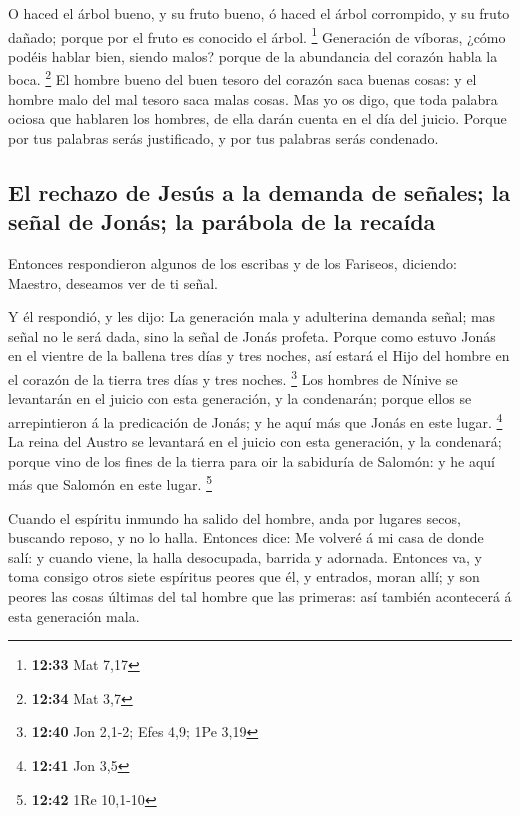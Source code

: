  O haced el árbol bueno, y su fruto bueno, ó haced el
árbol corrompido, y su fruto dañado; porque por el fruto es conocido el
árbol. \footnote{\textbf{12:33} Mat 7,17}  Generación de
víboras, ¿cómo podéis hablar bien, siendo malos? porque de la abundancia
del corazón habla la boca. \footnote{\textbf{12:34} Mat 3,7}
 El hombre bueno del buen tesoro del corazón saca buenas
cosas: y el hombre malo del mal tesoro saca malas cosas. 
Mas yo os digo, que toda palabra ociosa que hablaren los hombres, de
ella darán cuenta en el día del juicio.  Porque por tus
palabras serás justificado, y por tus palabras serás condenado.

\hypertarget{el-rechazo-de-jesuxfas-a-la-demanda-de-seuxf1ales-la-seuxf1al-de-jonuxe1s-la-paruxe1bola-de-la-recauxedda}{%
\subsection{El rechazo de Jesús a la demanda de señales; la señal de
Jonás; la parábola de la
recaída}\label{el-rechazo-de-jesuxfas-a-la-demanda-de-seuxf1ales-la-seuxf1al-de-jonuxe1s-la-paruxe1bola-de-la-recauxedda}}

 Entonces respondieron algunos de los escribas y de los
Fariseos, diciendo: Maestro, deseamos ver de ti señal.

 Y él respondió, y les dijo: La generación mala y
adulterina demanda señal; mas señal no le será dada, sino la señal de
Jonás profeta.  Porque como estuvo Jonás en el vientre de
la ballena tres días y tres noches, así estará el Hijo del hombre en el
corazón de la tierra tres días y tres noches. \footnote{\textbf{12:40}
  Jon 2,1-2; Efes 4,9; 1Pe 3,19}  Los hombres de Nínive
se levantarán en el juicio con esta generación, y la condenarán; porque
ellos se arrepintieron á la predicación de Jonás; y he aquí más que
Jonás en este lugar. \footnote{\textbf{12:41} Jon 3,5} 
La reina del Austro se levantará en el juicio con esta generación, y la
condenará; porque vino de los fines de la tierra para oir la sabiduría
de Salomón: y he aquí más que Salomón en este lugar. \footnote{\textbf{12:42}
  1Re 10,1-10}

 Cuando el espíritu inmundo ha salido del hombre, anda
por lugares secos, buscando reposo, y no lo halla. 
Entonces dice: Me volveré á mi casa de donde salí: y cuando viene, la
halla desocupada, barrida y adornada.  Entonces va, y
toma consigo otros siete espíritus peores que él, y entrados, moran
allí; y son peores las cosas últimas del tal hombre que las primeras:
así también acontecerá á esta generación mala.

